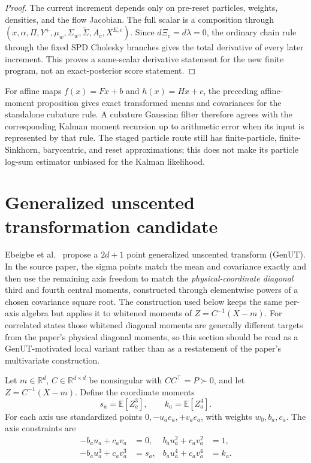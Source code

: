 \begin{proof}
The current increment depends only on pre-reset particles, weights, densities,
and the flow Jacobian.  The full scalar is a composition through
\((x,\alpha,\Pi,Y^+,\mu_w,\Sigma_w,\widetilde\Sigma,A_c,X^{E,c})\).  Since
\(d\Xi_c=d\lambda=0\), the ordinary chain rule through the fixed SPD Cholesky
branches gives the total derivative of every later increment.  This proves a
same-scalar derivative statement for the new finite program, not an
exact-posterior score statement.
\end{proof}

For affine maps \(f(x)=Fx+b\) and \(h(x)=Hx+c\), the preceding affine-moment
proposition gives exact transformed means and covariances for the standalone
cubature rule.  A cubature Gaussian filter therefore agrees with the
corresponding Kalman moment recursion up to arithmetic error when its input is
represented by that rule.  The staged particle route still has finite-particle,
finite-Sinkhorn, barycentric, and reset approximations; this does not make its
particle log-sum estimator unbiased for the Kalman likelihood.

\section{Generalized unscented transformation candidate}
\label{sec:bf-eot-genut}

Ebeigbe et al.~\cite{ebeigbe2025genut} propose a $2d+1$ point generalized
unscented transform (GenUT).  In the source paper, the sigma points match the
mean and covariance exactly and then use the remaining axis freedom to match
the \emph{physical-coordinate diagonal} third and fourth central moments,
constructed through elementwise powers of a chosen covariance square root.
The construction used below keeps the same per-axis algebra but applies it to
whitened moments of $Z=C^{-1}(X-m)$.  For correlated states those whitened
diagonal moments are generally different targets from the paper's physical
diagonal moments, so this section should be read as a GenUT-motivated local
variant rather than as a restatement of the paper's multivariate construction.

Let \(m\in\mathbb R^d\), \(C\in\mathbb R^{d\times d}\) be nonsingular with
\(CC^\top=P\succ0\), and let \(Z=C^{-1}(X-m)\).  Define the coordinate moments
\begin{equation}
 s_a=\mathbb E[Z_a^3],\qquad k_a=\mathbb E[Z_a^4].
\end{equation}
For each axis use standardized points \(0,-u_ae_a,+v_ae_a\), with weights
\(w_0,b_a,c_a\).  The axis constraints are
\begin{align}
 -b_au_a+c_av_a&=0,&
 b_au_a^2+c_av_a^2&=1,\\
 -b_au_a^3+c_av_a^3&=s_a,&
 b_au_a^4+c_av_a^4&=k_a.
\end{align}

